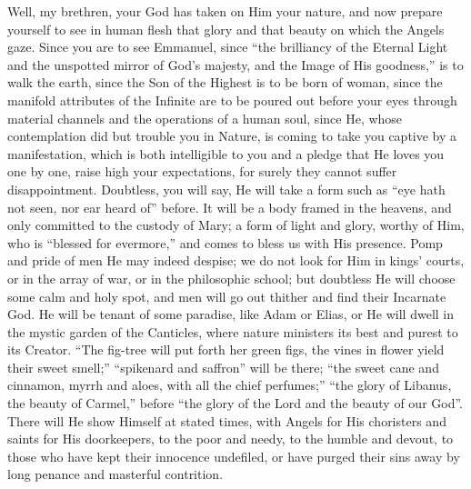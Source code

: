 Well, my brethren, your God has taken on Him your nature, and now
prepare yourself to see in human flesh that glory and that beauty on
which the Angels gaze. Since you are to see Emmanuel, since ``the
brilliancy of the Eternal Light and the unspotted mirror of God's
majesty, and the Image of His goodness,'' is to walk the earth,
since the Son of the Highest is to be born of woman, since the
manifold attributes of the Infinite are to be poured out before your
eyes through material channels and the operations of a human soul,
since He, whose contemplation did but trouble you in Nature, is coming
to take you captive by a manifestation, which is both intelligible to
you and a pledge that He loves you one by one, raise high your
expectations, for surely they cannot suffer disappointment. Doubtless,
you will say, He will take a form such as ``eye hath not seen, nor
ear heard of'' before. It will be a body framed in the heavens,
and only committed to the custody of Mary; a form of light and glory,
worthy of Him, who is ``blessed for evermore,'' and comes to
bless us with His presence. Pomp and pride of men He may indeed
despise; we do not look for Him in kings' courts, or in the array of
war, or in the philosophic school; but doubtless He will choose some
calm and holy spot, and men will go out thither and find their
Incarnate God. He will be tenant of some paradise, like Adam or Elias,
or He will dwell in the mystic garden of the Canticles, where nature
ministers its best and purest to its Creator. ``The fig-tree will
put forth her green figs, the vines in flower yield their sweet
smell;'' ``spikenard and saffron'' will be there;
``the sweet cane and cinnamon, myrrh and aloes, with all the chief
perfumes;'' ``the glory of Libanus, the beauty of
Carmel,'' before ``the glory of the Lord and the beauty of our
God''. There will He show Himself at stated times, with Angels for
His choristers and saints for His doorkeepers, to the poor and needy,
to the humble and devout, to those who have kept their innocence
undefiled, or have purged their sins away by long penance and
masterful contrition.

